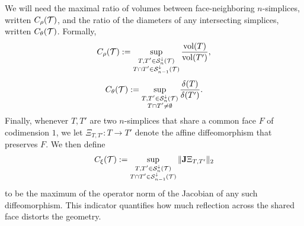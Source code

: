 \documentclass[10pt,a4paper]{article}
\begin{document}
We will need the maximal ratio of volumes between face-neighboring $n$-simplices, written $C_\rho({\mathcal T})$,
and the ratio of the diameters of any intersecting simplices, written $C_\theta({\mathcal T})$. Formally, 
\begin{align}\label{math:volumeratio}
    C_\rho({\mathcal T}) 
    := 
    \sup_{ \substack{ T, T' \in {\mathcal S}^{\downarrow}_{n}({\mathcal T}) \\ T \cap T' \in {\mathcal S}^{\downarrow}_{n-1}({\mathcal T}) } } 
    \frac{ \operatorname{vol}(T) }{ \operatorname{vol}(T') }
    ,
\end{align}
\begin{align}\label{math:diameterratio}
    C_\theta({\mathcal T}) 
    := 
    \sup_{ \substack{ T, T' \in {\mathcal S}^{\downarrow}_{n}({\mathcal T}) \\ T \cap T' \neq \emptyset } }
    \frac{ {\delta}(T) }{ {\delta}(T') }
    .
\end{align}
Finally, whenever $T, T'$ are two $n$-simplices that share a common face $F$ of codimension $1$, we let $\Xi_{T,T'} : T \rightarrow T'$ denote the affine diffeomorphism 
that preserves $F$. We then define 
\begin{align}\label{math:reflectionmeasure}
    C_\xi({\mathcal T}) 
    := 
    \sup_{ \substack{ T, T' \in {\mathcal S}^{\downarrow}_{n}({\mathcal T}) \\ T \cap T' \in {\mathcal S}^{\downarrow}_{n-1}({\mathcal T}) } }
    \|  {\mathbf{J}} \Xi_{T,T'}  \|_{2}
\end{align}
to be the maximum of the operator norm of the Jacobian of any such diffeomorphism. 
This indicator quantifies how much reflection across the shared face distorts the geometry. 
\end{document}
